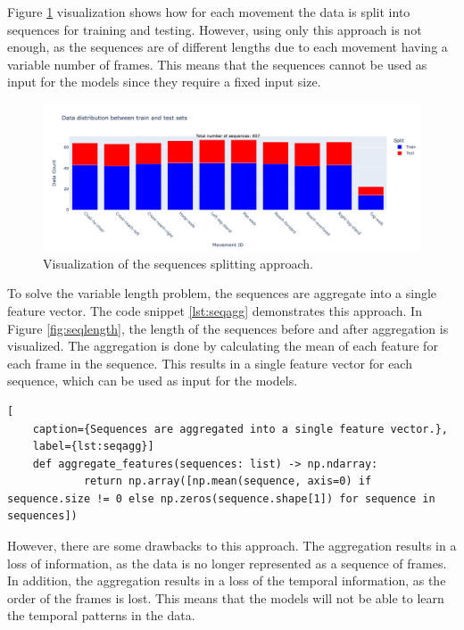             Figure \ref{fig:seqsplit} visualization shows how for each movement the data is split into sequences for training and testing. However, using only this approach is not enough, as the sequences are of different lengths due to each movement having a variable number of frames. This means that the sequences cannot be used as input for the models since they require a fixed input size. 
        
            \begin{figure}[H]
            \centering
            \includegraphics[width=1.0\textwidth]{../src/resources/plots/splits/seq.png}
            \caption{
                Visualization of the sequences splitting approach.
            }
            \label{fig:seqsplit}
        \end{figure}

        \newpage 

        To solve the variable length problem, the sequences are aggregate into a single feature vector. The code snippet \ref{lst:seqagg} demonstrates this approach. In Figure \ref{fig:seqlength}, the length of the sequences before and after aggregation is visualized. The aggregation is done by calculating the mean of each feature for each frame in the sequence. This results in a single feature vector for each sequence, which can be used as input for the models.

\begin{lstlisting}[
    caption={Sequences are aggregated into a single feature vector.}, 
    label={lst:seqagg}]                
    def aggregate_features(sequences: list) -> np.ndarray:
            return np.array([np.mean(sequence, axis=0) if sequence.size != 0 else np.zeros(sequence.shape[1]) for sequence in sequences])
\end{lstlisting}
        
However, there are some drawbacks to this approach. The aggregation results in a loss of information, as the data is no longer represented as a sequence of frames. In addition, the aggregation results in a loss of the temporal information, as the order of the frames is lost. This means that the models will not be able to learn the temporal patterns in the data.

